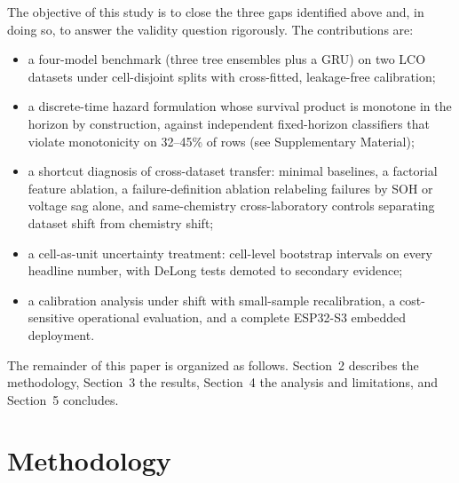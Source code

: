 \documentclass[11pt,a4paper]{article}
\begin{document}
The objective of this study is to close the three gaps identified above and, in doing so, to answer the validity question rigorously. The contributions are:
\begin{itemize}
\item a four-model benchmark (three tree ensembles plus a GRU) on two LCO datasets under cell-disjoint splits with cross-fitted, leakage-free calibration;
\item a discrete-time hazard formulation whose survival product is monotone in the horizon by construction, against independent fixed-horizon classifiers that violate monotonicity on 32--45\% of rows (see Supplementary Material);
\item a shortcut diagnosis of cross-dataset transfer: minimal baselines, a factorial feature ablation, a failure-definition ablation relabeling failures by SOH or voltage sag alone, and same-chemistry cross-laboratory controls separating dataset shift from chemistry shift;
\item a cell-as-unit uncertainty treatment: cell-level bootstrap intervals on every headline number, with DeLong tests demoted to secondary evidence;
\item a calibration analysis under shift with small-sample recalibration, a cost-sensitive operational evaluation, and a complete ESP32-S3 embedded deployment.
\end{itemize}

The remainder of this paper is organized as follows. Section~2 describes the methodology, Section~3 the results, Section~4 the analysis and limitations, and Section~5 concludes.

\section{Methodology}
\end{document}
